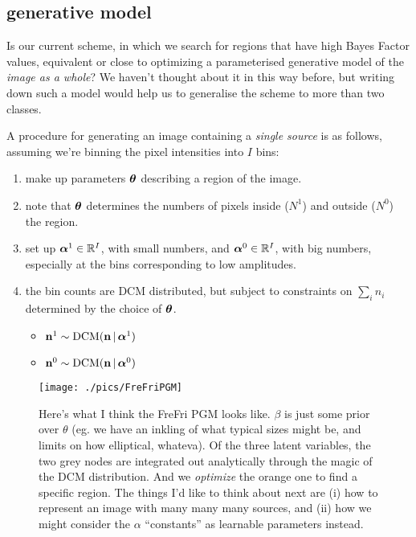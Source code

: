 \documentclass[12pt]{article}
\newcommand{\given}{\,|\,}
\renewcommand{\vec}[1]{\mathbf{#1}}
\newcommand{\balpha}{\mbox{\boldmath $\alpha$}}
\newcommand{\btheta}{\mbox{\boldmath $\theta$}}
\newcommand{\DCM}{\mbox{DCM}}
\begin{document}
\subsection{generative model}
Is our current scheme, in which we search for regions that have high
Bayes Factor values, equivalent or close to optimizing a parameterised
generative model of the \emph{image as a whole}? We haven't thought about it
in this way before, but writing down such a model would help us to
generalise the scheme to more than two classes.

A procedure for generating an image containing a \emph{single source}
is as follows, assuming we're binning the pixel intensities into $I$ bins:
\begin{enumerate}
\item make up parameters $\btheta$ describing a region of the image.
\item note that $\btheta$ determines the numbers of pixels inside ($N^1$)  and  outside ($N^0$) the region.
\item set up $\balpha^1 \in \mathbb{R}^I$, with small numbers,
  and $\balpha^0 \in \mathbb{R}^I$, with big numbers, especially at the bins corresponding to low amplitudes.
\item the bin counts are DCM distributed, but subject to constraints on $\sum_i n_i$ determined by the choice of $\btheta$.
  \begin{itemize}
    \item    $\vec{n}^1 \sim \DCM(\vec{n} \given \balpha^1)$
    \item $\vec{n}^0 \sim \DCM(\vec{n} \given \balpha^0)$
  \end{itemize}
\end{enumerate}


\begin{figure}
\texttt{[image: ./pics/FreFriPGM]}
\caption{Here's what I think the {\sc FreFri} PGM looks like. $\beta$ is just some prior over $\theta$ (eg. we have an inkling of what typical sizes might be, and limits on how elliptical, whateva). Of the three latent variables, the two grey nodes are integrated out analytically through the magic of the DCM distribution. And we {\it optimize} the orange one to find a specific region. The things I'd like to think about next are (i) how to represent an image with many many many sources, and (ii) how we might consider the $\alpha$ ``constants'' as learnable parameters instead.
\label{fig:FreFriPGM}
}
\end{figure}
\end{document}
